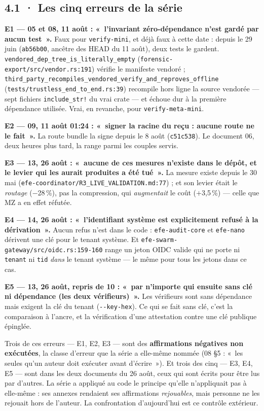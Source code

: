 \documentclass[10pt]{article}
\newcommand{\code}[1]{\texttt{\small #1}}
\newcommand{\loc}[1]{{\footnotesize\color{grey}\texttt{#1}}}
\newcommand{\pc}{\,\%}
\begin{document}
\subsection{4.1 · Les cinq erreurs de la série}

\begin{alerte}
\textbf{E1 --- 05 et 08, 11 août : «~l'invariant zéro-dépendance n'est gardé par aucun test~».} Faux pour
\code{verify-mini}, et déjà faux à cette date : depuis le 29 juin (\code{ab56b00}, ancêtre des HEAD du 11 août), deux
tests le gardent. \code{vendored\_dep\_tree\_is\_literally\_empty} (\loc{forensic-export/src/vendor.rs:191}) vérifie
le manifeste vendoré ; \code{third\_party\_recompiles\_vendored\_verify\_and\_reproves\_offline}
(\loc{tests/trustless\_end\_to\_end.rs:39}) recompile hors ligne la source vendorée --- sept fichiers
\code{include\_str!} du vrai crate --- et échoue dur à la première dépendance utilisée. Vrai, en revanche, pour
\code{verify-meta-mini}.

\textbf{E2 --- 09, 11 août 01:24 : «~signer la racine du reçu : aucune route ne le fait~».} La route bundle la signe
depuis le 8 août (\code{c51c538}). Le document 06, deux heures plus tard, la range parmi les couples servis.

\textbf{E3 --- 13, 26 août : «~aucune de ces mesures n'existe dans le dépôt, et le levier qui les aurait produites a
été tué~».} La mesure existe depuis le 30 mai (\loc{efe-coordinator/R3\_LIVE\_VALIDATION.md:77}) ; et son levier
était le \emph{routage} ($-$28\pc{}), pas la compression, qui \emph{augmentait} le coût ($+$3,5\pc{}) --- celle que MZ
a en effet réfutée.

\textbf{E4 --- 14, 26 août : «~l'identifiant système est explicitement refusé à la dérivation~».} Aucun refus n'est
dans le code : \code{efe-audit-core} et \code{efe-nano} dérivent une clé pour le tenant système. Et
\loc{efe-swarm-gateway/src/oidc.rs:159-160} range un jeton OIDC valide qui ne porte ni \code{tenant} ni \code{tid}
\emph{dans} le tenant système --- le même pour tous les jetons dans ce cas.

\textbf{E5 --- 13, 26 août, repris de 10 : «~par n'importe qui ensuite sans clé ni dépendance (les deux
vérifieurs)~».} Les vérifieurs sont sans dépendance mais exigent la clé du tenant (\code{-{}-key-hex}). Ce qui se
fait sans clé, c'est la comparaison à l'ancre, et la vérification d'une attestation contre une clé publique
épinglée.
\end{alerte}

Trois de ces erreurs --- E1, E2, E3 --- sont des \textbf{affirmations négatives non exécutées}, la classe d'erreur
que la série a elle-même nommée (08 §5 : «~les seules qu'un auteur doit exécuter avant d'écrire~»). Et trois des
cinq --- E3, E4, E5 --- sont dans les deux documents du 26 août, ceux qui sont écrits pour être lus par d'autres. La
série a appliqué au code le principe qu'elle n'appliquait pas à elle-même : ses annexes rendaient ses affirmations
\emph{rejouables}, mais personne ne les rejouait hors de l'auteur. La confrontation d'aujourd'hui est ce contrôle
extérieur.
\end{document}
